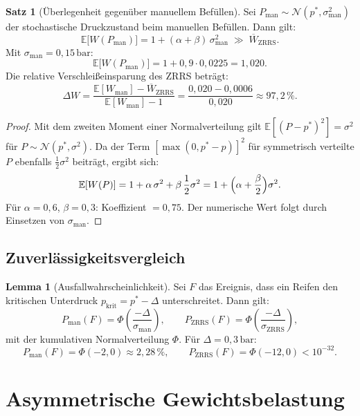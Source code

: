 ﻿\documentclass[a4paper,12pt]{article}
\theoremstyle{definition}
\newtheorem{satz}{Satz}
\newtheorem{lemma}{Lemma}
\begin{document}
\begin{satz}[Überlegenheit gegenüber manuellem Befüllen]
\label{satz:vergleich}
Sei $P_{\text{man}} \sim \mathcal{N}(p^*, \sigma_{\text{man}}^2)$ der stochastische
Druckzustand beim manuellen Befüllen. Dann gilt:
\[
    \mathbb{E}\bigl[W(P_{\text{man}})\bigr]
    = 1 + (\alpha + \beta)\,\sigma_{\text{man}}^2
    \;\gg\;
    \overline{W}_{\text{ZRRS}}.
\]
Mit $\sigma_{\text{man}} = 0{,}15\,\text{bar}$:
\[
    \mathbb{E}\bigl[W(P_{\text{man}})\bigr]
    = 1 + 0{,}9 \cdot 0{,}0225 = 1{,}020.
\]
Die relative Verschleißeinsparung des ZRRS beträgt:
\[
    \Delta W = \frac{\mathbb{E}[W_{\text{man}}] - \overline{W}_{\text{ZRRS}}}
                    {\mathbb{E}[W_{\text{man}}] - 1}
    = \frac{0{,}020 - 0{,}0006}{0{,}020} \approx 97{,}2\,\%.
\]
\end{satz}

\begin{proof}
Mit dem zweiten Moment einer Normalverteilung gilt
$\mathbb{E}[(P - p^*)^2] = \sigma^2$ für $P \sim \mathcal{N}(p^*, \sigma^2)$.
Da der Term $[\max(0, p^* - p)]^2$ für symmetrisch verteilte $P$ ebenfalls
$\frac{1}{2}\sigma^2$ beiträgt, ergibt sich:
\[
    \mathbb{E}[W(P)] = 1 + \alpha\,\sigma^2 + \beta\,\frac{1}{2}\sigma^2
    = 1 + \Bigl(\alpha + \frac{\beta}{2}\Bigr)\sigma^2.
\]
Für $\alpha = 0{,}6$, $\beta = 0{,}3$: Koeffizient $= 0{,}75$.
Der numerische Wert folgt durch Einsetzen von $\sigma_{\text{man}}$.
\end{proof}

\subsection{Zuverlässigkeitsvergleich}

\begin{lemma}[Ausfallwahrscheinlichkeit]
\label{lem:ausfall}
Sei $F$ das Ereignis, dass ein Reifen den kritischen Unterdruck
$p_{\text{krit}} = p^* - \Delta$ unterschreitet. Dann gilt:
\[
    P_{\text{man}}(F) = \Phi\!\left(\frac{-\Delta}{\sigma_{\text{man}}}\right),
    \qquad
    P_{\text{ZRRS}}(F) = \Phi\!\left(\frac{-\Delta}{\sigma_{\text{ZRRS}}}\right),
\]
mit der kumulativen Normalverteilung $\Phi$. Für $\Delta = 0{,}3\,\text{bar}$:
\[
    P_{\text{man}}(F) = \Phi(-2{,}0) \approx 2{,}28\,\%,
    \qquad
    P_{\text{ZRRS}}(F) = \Phi(-12{,}0) < 10^{-32}.
\]
\end{lemma}

\section{Asymmetrische Gewichtsbelastung}
\label{sec:asymm}
\end{document}
